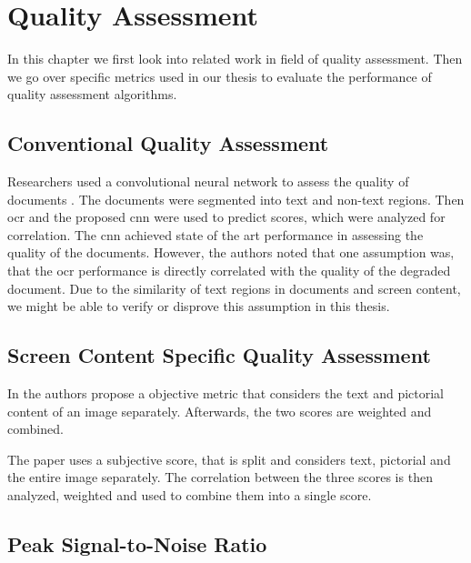 \chapter{Quality Assessment}
\label{chap:qualityassessment}

In this chapter we first look into related work in field of quality assessment.
Then we go over specific metrics used in our thesis to evaluate the performance of quality assessment algorithms.

\section{Conventional Quality Assessment}

Researchers used a convolutional neural network to assess the quality of documents \cite{ocr_cnn_docu_2014}.
The documents were segmented into text and non-text regions.
Then \gls{ocr} and the proposed \gls{cnn} were used to predict scores, which were analyzed for correlation.
The \gls{cnn} achieved state of the art performance in assessing the quality of the documents.
However, the authors noted that one assumption was, that the \gls{ocr} performance is directly correlated with the quality of the degraded document.
Due to the similarity of text regions in documents and screen content, we might be able to verify or disprove this assumption in this thesis.

\section{Screen Content Specific Quality Assessment}

In \cite{text_pict_weight_2017} the authors propose a objective metric that considers the text and pictorial content of an image separately.
Afterwards, the two scores are weighted and combined.

The paper \cite{3_subj_weight_2015} uses a subjective score, that is split and considers text, pictorial and the entire image separately.
The correlation between the three scores is then analyzed, weighted and used to combine them into a single score.



\section{Peak Signal-to-Noise Ratio}
\label{subsec:psnr}

